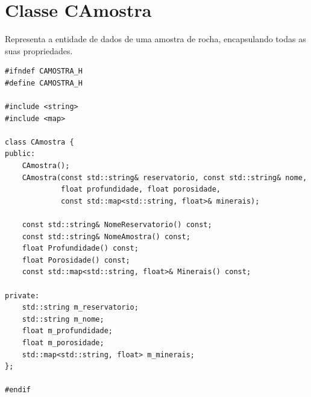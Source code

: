 \section{Classe CAmostra}
Representa a entidade de dados de uma amostra de rocha, encapsulando todas as suas propriedades.
\begin{verbatim}
#ifndef CAMOSTRA_H
#define CAMOSTRA_H

#include <string>
#include <map>

class CAmostra {
public:
    CAmostra();
    CAmostra(const std::string& reservatorio, const std::string& nome,
             float profundidade, float porosidade,
             const std::map<std::string, float>& minerais);

    const std::string& NomeReservatorio() const;
    const std::string& NomeAmostra() const;
    float Profundidade() const;
    float Porosidade() const;
    const std::map<std::string, float>& Minerais() const;

private:
    std::string m_reservatorio;
    std::string m_nome;
    float m_profundidade;
    float m_porosidade;
    std::map<std::string, float> m_minerais;
};

#endif
\end{verbatim}